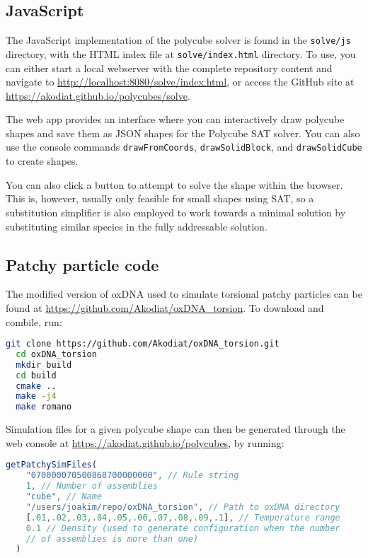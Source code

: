 \subsection{JavaScript}
 The JavaScript implementation of the polycube solver is found in the \texttt{solve/js} directory, with the  HTML index file at \texttt{solve/index.html} directory. To use, you can either start a local webserver with the complete repository content and navigate to \url{http://localhost:8080/solve/index.html}, or access the GitHub site at \url{https://akodiat.github.io/polycubes/solve}.

 The web app provides an interface where you can interactively draw polycube shapes and save them as JSON shapes for the Polycube SAT solver. You can also use the console commands \texttt{drawFromCoords}, \texttt{drawSolidBlock}, and \texttt{drawSolidCube} to create shapes.

 You can also click a button to attempt to solve the shape within the browser. This is, however, usually only feasible for small shapes using SAT, so a substitution simplifier is also employed to work towards a minimal solution by substituting similar species in the fully addressable solution.


\subsection{Patchy particle code}
\label{sec:appendix_patchy}
The modified version of oxDNA used to simulate torsional patchy particles can be found at \url{https://github.com/Akodiat/oxDNA_torsion}. To download and combile, run:

\begin{lstlisting}[language=bash]
  git clone https://github.com/Akodiat/oxDNA_torsion.git
  cd oxDNA_torsion
  mkdir build
  cd build
  cmake ..
  make -j4
  make romano
\end{lstlisting}

Simulation files for a given polycube shape can then be generated through the web console at \url{https://akodiat.github.io/polycubes}, by running:

\begin{lstlisting}[language=JavaScript]
  getPatchySimFiles(
    "070000070500868700000000", // Rule string
    1, // Number of assemblies
    "cube", // Name
    "/users/joakim/repo/oxDNA_torsion", // Path to oxDNA directory
    [.01,.02,.03,.04,.05,.06,.07,.08,.09,.1], // Temperature range
    0.1 // Density (used to generate configuration when the number
    // of assemblies is more than one)
  )
\end{lstlisting}

